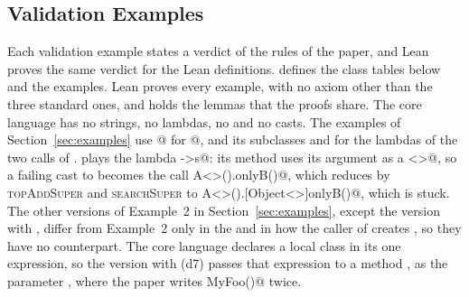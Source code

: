 \subsection{Validation Examples}
\label{app:lean:examples}
Each validation example states a verdict of the rules of the paper, and Lean proves the same verdict for the Lean definitions.
 defines the class tables below and the examples.
Lean proves every example, with no axiom other than the three standard ones, and  holds the lemmas that the proofs share.
The core language has no strings, no lambdas, no \Q@switch@ and no casts.
The examples of Section~\ref{sec:examples} use @ for @, and its subclasses \Q@AToB@ and \Q@AsB@ for the lambdas of the two calls of \Q@m@.
\Q@AsB@ plays the lambda \Q@s->s@: its method \Q@apply@ uses its argument as a \Q@B<>@, so a failing cast to \Q@String@ becomes the call \Q@new A<>().onlyB()@, which reduces by \textsc{topAddSuper} and \textsc{searchSuper} to \Q@new A<>().[Object<>]onlyB()@, which is stuck.
The other versions of Example~2 in Section~\ref{sec:examples}, except the version with \Q@show@, differ from Example~2 only in the \Q@switch@ and in how the caller of \Q@m@ creates \Q@f@, so they have no counterpart.
The core language declares a local class in its one \Q@new@ expression, so the version with \Q@show@ (d7) passes that expression to a method \Q@check@, as the parameter \Q@mine@, where the paper writes \Q@new MyFoo()@ twice.
